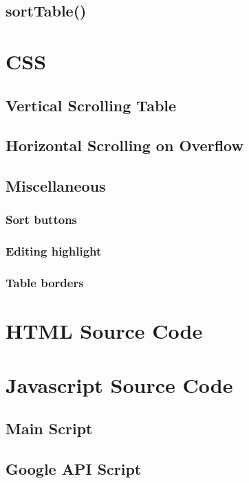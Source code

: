 \documentclass[letterpaper]{article}
\begin{document}
\subsection{sortTable()}

\newpage

\section{CSS}\label{CSS}

\subsection{Vertical Scrolling Table}
\subsection{Horizontal Scrolling on Overflow}\label{overflow-x}
\subsection{Miscellaneous}
\subsubsection{Sort buttons}
\subsubsection{Editing highlight}
\subsubsection{Table borders}

\newpage

\appendix
\section{HTML Source Code}

\newpage

\section{Javascript Source Code}
\subsection{Main Script}

\newpage
\subsection{Google API Script}

\newpage
\end{document}
